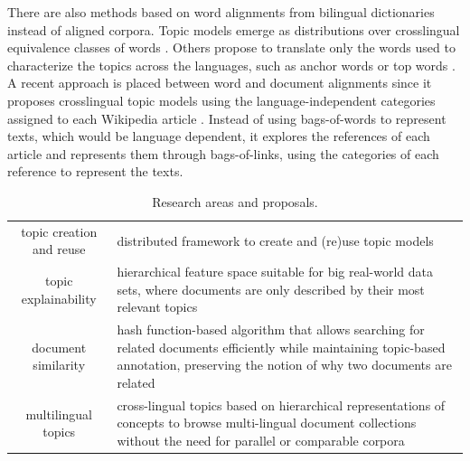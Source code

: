 There are also methods based on word alignments from bilingual dictionaries instead of aligned corpora. Topic models emerge as distributions over crosslingual equivalence classes of words \citep{Jagarlamudi2010, zhang-etal-2010-cross, shi-etal-2016-detecting, hao-paul-2018-learning}. Others propose to translate only the words used to characterize the topics across the languages, such as anchor words \citep{NEURIPS2018_28b9f8aa} or top words \citep{yang2019multilingual}. A recent approach is placed between word and document alignments since it proposes crosslingual topic models using the language-independent categories assigned to each Wikipedia article \citep{2020arXiv200911207P}. Instead of using bags-of-words to represent texts, which would be language dependent, it explores the references of each article and represents them through bags-of-links, using the categories of each reference to represent the texts.

\begin{table}[!htbp]
\centering%
\begin{tabularx}{\linewidth}{SH}
\toprule
{} &  \\
\midrule
\midrule
topic creation and reuse & distributed framework to create and  (re)use topic models\\
\midrule
topic explainability & hierarchical feature space suitable for big real-world data sets, where documents are only described by their most relevant topics\\
\midrule
document similarity & hash function-based algorithm that allows  searching for related documents efficiently while maintaining topic-based annotation, preserving the notion of why two documents are related  \\
\midrule
multilingual topics & cross-lingual topics based on hierarchical representations of concepts to browse multi-lingual document collections without the need for parallel or comparable corpora\\
\bottomrule
\end{tabularx}
\caption{Research areas and proposals.}
\label{table:proposals}
\end{table}

